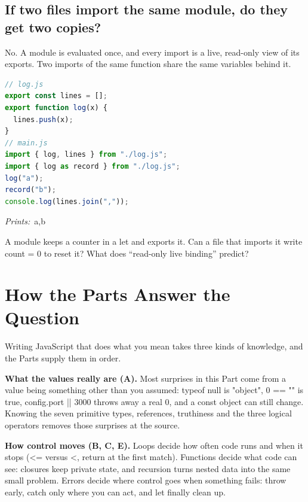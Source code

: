 \documentclass[10pt]{article}
\newcommand{\code}[1]{{\ttfamily\small #1}}
\newcommand{\mantra}[1]{\par\smallskip{\color{blue!45!black}\textbf{Rule:}~\emph{#1}}\par}
\begin{document}
\subsection{If two files import the same module, do they get two copies?}%
No. A module is evaluated once, and every import is a live, read-only view of its exports. Two imports of the same function share the same variables behind it.
\begin{lstlisting}[language=JavaScript]
// log.js
export const lines = [];
export function log(x) {
  lines.push(x);
}
// main.js
import { log, lines } from "./log.js";
import { log as record } from "./log.js";
log("a");
record("b");
console.log(lines.join(","));
\end{lstlisting}
{\small\textit{Prints:}~\code{a,b}}\par

\mantra{Export on purpose; import by name.}
\begin{ponder}A module keeps a counter in a \code{let} and exports it. Can a file that imports it write \code{count = 0} to reset it? What does ``read-only live binding'' predict?\end{ponder}

\label{synthesis}
\section*{How the Parts Answer the Question}

Writing JavaScript that does what you mean takes three kinds of knowledge, and the Parts supply them in order.

\textbf{What the values really are (A).} Most surprises in this Part come from a value being something other than you assumed: \code{typeof null} is \code{"object"}, \code{0 == ""} is true, \code{config.port || 3000} throws away a real \code{0}, and a \code{const} object can still change. Knowing the seven primitive types, references, truthiness and the three logical operators removes those surprises at the source.

\textbf{How control moves (B, C, E).} Loops decide how often code runs and when it stops (\code{<=} versus \code{<}, \code{return} at the first match). Functions decide what code can see: closures keep private state, and recursion turns nested data into the same small problem. Errors decide where control goes when something fails: throw early, catch only where you can act, and let \code{finally} clean up.
\end{document}
